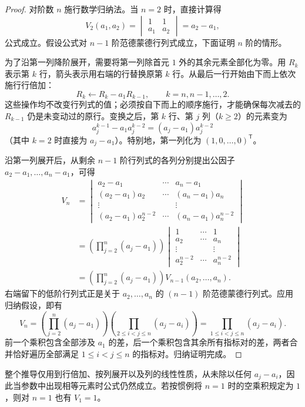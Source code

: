 \documentclass[UTF8, fontset=fandol, a4paper, 12pt]{ctexart}
\theoremstyle{definition}
\begin{document}
\begin{proof}
对阶数 $n$ 施行数学归纳法。当 $n=2$ 时，直接计算得
\[
 V_2(a_1,a_2)=
 \begin{vmatrix}1&1\\a_1&a_2\end{vmatrix}=a_2-a_1,
\]
公式成立。假设公式对 $n-1$ 阶范德蒙德行列式成立，下面证明 $n$ 阶的情形。

为了沿第一列降阶展开，需要将第一列除首元 $1$ 外的其余元素全部化为零。用 $R_k$ 表示第 $k$ 行，箭头表示用右端的行替换原第 $k$ 行。从最后一行开始由下而上依次施行行倍加：
\[
 R_k\leftarrow R_k-a_1R_{k-1},
 \qquad k=n,n-1,\ldots,2.
\]
这些操作均不改变行列式的值；必须按自下而上的顺序施行，才能确保每次减去的 $R_{k-1}$ 仍是未变动过的原行。变换之后，第 $k$ 行、第 $j$ 列（$k\ge2$）的元素变为
\[
 a_j^{k-1}-a_1a_j^{k-2}=(a_j-a_1)a_j^{k-2}
\]
（其中 $k=2$ 时直接为 $a_j-a_1$）。特别地，第一列化为 $(1,0,\ldots,0)^{\mathsf T}$。

沿第一列展开后，从剩余 $n-1$ 阶行列式的各列分别提出公因子 $a_2-a_1,\ldots,a_n-a_1$，可得
\begin{align*}
 V_n
 &=
 \begin{vmatrix}
 a_2-a_1&\cdots&a_n-a_1\\
 (a_2-a_1)a_2&\cdots&(a_n-a_1)a_n\\
 \vdots&&\vdots\\
 (a_2-a_1)a_2^{n-2}&\cdots&(a_n-a_1)a_n^{n-2}
 \end{vmatrix}\\
 &=\left(\prod_{j=2}^n(a_j-a_1)\right)
 \begin{vmatrix}
 1&\cdots&1\\
 a_2&\cdots&a_n\\
 \vdots&&\vdots\\
 a_2^{n-2}&\cdots&a_n^{n-2}
 \end{vmatrix}\\
 &=\left(\prod_{j=2}^n(a_j-a_1)\right)V_{n-1}(a_2,\ldots,a_n).
\end{align*}
右端留下的低阶行列式正是关于 $a_2,\ldots,a_n$ 的 $(n-1)$ 阶范德蒙德行列式。应用归纳假设，即有
\[
 V_n=
 \left(\prod_{j=2}^n(a_j-a_1)\right)
 \left(\prod_{2\le i<j\le n}(a_j-a_i)\right)
 =\prod_{1\le i<j\le n}(a_j-a_i).
\]
前一个乘积包含全部涉及 $a_1$ 的差，后一个乘积包含其余所有指标对的差，两者合并恰好遍历全部满足 $1\le i<j\le n$ 的指标对。归纳证明完成。
\end{proof}

整个推导仅用到行倍加、按列展开以及列的线性性质，从未除以任何 $a_j-a_i$，因此当参数中出现相等元素时公式仍然成立。若按惯例将 $n=1$ 时的空乘积规定为 $1$，则对 $n=1$ 也有 $V_1=1$。
\end{document}

